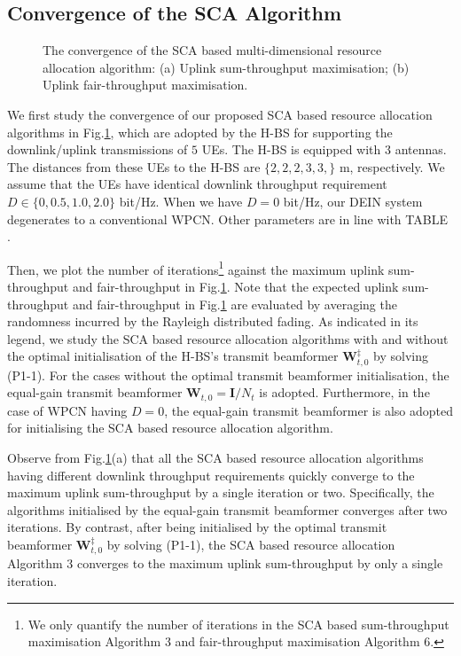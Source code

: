\documentclass[12pt,draftcls,onecolumn,journal]{IEEEtran}
\begin{document}
\subsection{Convergence of the SCA Algorithm}

\begin{figure}[!t]
\setlength{\abovecaptionskip}{0pt}
\setlength{\belowcaptionskip}{0pt}\caption{The convergence of the SCA based multi-dimensional resource allocation algorithm: (a) Uplink sum-throughput maximisation; (b) Uplink fair-throughput maximisation.}
\label{fig:Iteration}
\end{figure}

We first study the convergence of our proposed SCA based resource allocation algorithms in Fig.\ref{fig:Iteration}, which are adopted by the H-BS for supporting the downlink/uplink transmissions of $5$ UEs. The H-BS is equipped with $3$ antennas. The distances from these UEs to the H-BS are $\{2,2,2,3,3,\}$ m, respectively. We assume that the UEs have identical downlink throughput requirement $D\in \{0,0.5,1.0,2.0\}$ bit/Hz. When we have $D=0$ bit/Hz, our DEIN system degenerates to a conventional WPCN. Other parameters are in line with TABLE \uppercase\expandafter{}.

Then, we plot the number of iterations\footnote{We only quantify the number of iterations in the SCA based sum-throughput maximisation Algorithm 3 and fair-throughput maximisation Algorithm 6.} against the maximum uplink sum-throughput and fair-throughput in Fig.\ref{fig:Iteration}. Note that the expected uplink sum-throughput and fair-throughput in Fig.\ref{fig:Iteration} are evaluated by averaging the randomness incurred by the Rayleigh distributed fading. As indicated in its legend, we study the SCA based resource allocation algorithms with and without the optimal initialisation of the H-BS's transmit beamformer $\mathbf{W}_{t,0}^{\ddagger}$ by solving (P1-1). For the cases without the optimal transmit beamformer initialisation, the equal-gain transmit beamformer $\mathbf{W}_{t,0} = \mathbf{I}/N_t$ is adopted. Furthermore, in the case of WPCN having $D = 0$, the equal-gain transmit beamformer is also adopted for initialising the SCA based resource allocation algorithm.

Observe from Fig.\ref{fig:Iteration}(a) that all the SCA based resource allocation algorithms having different downlink throughput requirements quickly converge to the maximum uplink sum-throughput by a single iteration or two. Specifically, the algorithms initialised by the equal-gain transmit beamformer converges after two iterations. By contrast, after being initialised by the optimal transmit beamformer $\mathbf{W}_{t,0}^{\ddagger}$ by solving (P1-1), the SCA based resource allocation Algorithm 3 converges to the maximum uplink sum-throughput by only a single iteration.
\end{document}
